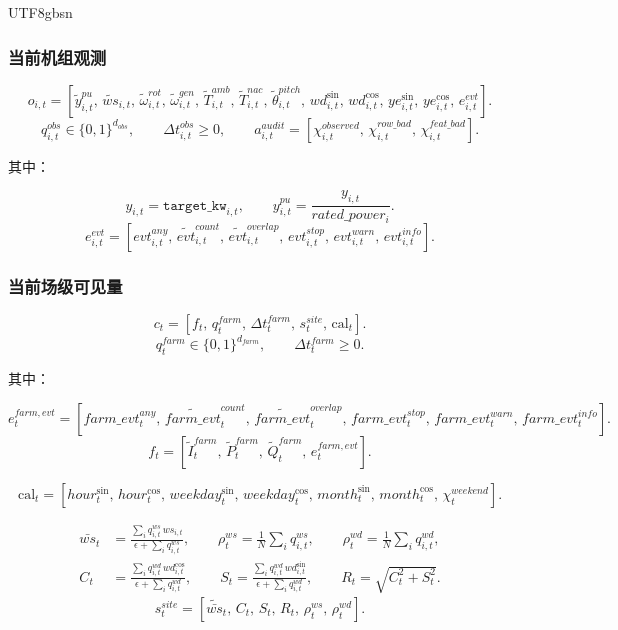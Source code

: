 \documentclass[11pt]{article}
\begin{document}
\begin{CJK}{UTF8}{gbsn}
\subsubsection{当前机组观测}

\begin{equation*}
  o_{i,t}=\left[
  \widetilde{y}^{pu}_{i,t},\,
  \widetilde{ws}_{i,t},\,
  \widetilde{\omega}^{rot}_{i,t},\,
  \widetilde{\omega}^{gen}_{i,t},\,
  \widetilde{T}^{amb}_{i,t},\,
  \widetilde{T}^{nac}_{i,t},\,
  \widetilde{\theta}^{pitch}_{i,t},\,
  wd^{\sin}_{i,t},\,
  wd^{\cos}_{i,t},\,
  ye^{\sin}_{i,t},\,
  ye^{\cos}_{i,t},\,
  e^{evt}_{i,t}
  \right].
\end{equation*}
\[
q^{obs}_{i,t}\in\{0,1\}^{d_{obs}},\qquad
\Delta t^{obs}_{i,t}\ge 0,\qquad
  a^{audit}_{i,t}=
  \left[
    \chi^{observed}_{i,t},\,
    \chi^{row\_bad}_{i,t},\,
    \chi^{feat\_bad}_{i,t}
  \right].
\]

其中：

\[
  y_{i,t}=\texttt{target\_kw}_{i,t},\qquad
  y^{pu}_{i,t}=\frac{y_{i,t}}{rated\_power_i}.
\]
\[
  e^{evt}_{i,t}=
  \left[
    evt^{any}_{i,t},\,
    \widetilde{evt}^{count}_{i,t},\,
    \widetilde{evt}^{overlap}_{i,t},\,
    evt^{stop}_{i,t},\,
    evt^{warn}_{i,t},\,
    evt^{info}_{i,t}
  \right].
\]

\subsubsection{当前场级可见量}
\[
c_t=\left[
  f_t,\,
  q^{farm}_t,\,
  \Delta t^{farm}_t,\,
  s^{site}_t,\,
  \mathrm{cal}_t
\right].
\]
\[
q^{farm}_t\in\{0,1\}^{d_{farm}},\qquad
\Delta t^{farm}_t\ge 0.
\]

其中：

\[
e^{farm,evt}_t=
\left[
  farm\_evt^{any}_t,\,
  \widetilde{farm\_evt}^{count}_t,\,
  \widetilde{farm\_evt}^{overlap}_t,\,
  farm\_evt^{stop}_t,\,
  farm\_evt^{warn}_t,\,
  farm\_evt^{info}_t
\right].
\]
\[
f_t=
\left[
  \widetilde{I}^{farm}_t,\,
  \widetilde{P}^{farm}_t,\,
  \widetilde{Q}^{farm}_t,\,
  e^{farm,evt}_t
\right].
\]

\[
\mathrm{cal}_t=\left[
  hour^{\sin}_t,\,
  hour^{\cos}_t,\,
  weekday^{\sin}_t,\,
  weekday^{\cos}_t,\,
  month^{\sin}_t,\,
  month^{\cos}_t,\,
  \chi^{weekend}_t
\right].
\]

\[
\begin{aligned}
\bar{ws}_t&=\frac{\sum_i q^{ws}_{i,t}\, ws_{i,t}}{\epsilon+\sum_i q^{ws}_{i,t}},\qquad
\rho^{ws}_t=\frac{1}{N}\sum_i q^{ws}_{i,t}, \qquad \rho^{wd}_t=\frac{1}{N}\sum_i q^{wd}_{i,t}, \\
C_t&=\frac{\sum_i q^{wd}_{i,t}\, wd^{\cos}_{i,t}}{\epsilon+\sum_i q^{wd}_{i,t}},\qquad
S_t=\frac{\sum_i q^{wd}_{i,t}\, wd^{\sin}_{i,t}}{\epsilon+\sum_i q^{wd}_{i,t}},\qquad
R_t=\sqrt{C_t^2+S_t^2}.
\end{aligned}
\]
\[
s^{site}_t=\left[
  \widetilde{\bar{ws}}_t,\,
  C_t,\,
  S_t,\,
  R_t,\,
  \rho^{ws}_t,\,
  \rho^{wd}_t
\right].
\]



\end{CJK}
\end{document}
